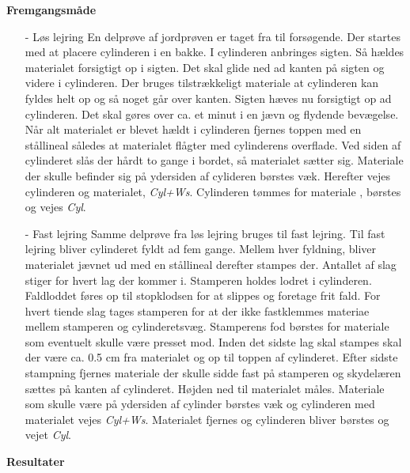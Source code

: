 \textbf{Fremgangsmåde}
\begin{itemize}
	\item[-] Løs lejring
En delprøve af jordprøven er taget fra til forsøgende. Der startes med at placere cylinderen i en bakke. I cylinderen anbringes sigten. Så hældes materialet forsigtigt  op i sigten. Det skal glide ned ad kanten på sigten og videre i cylinderen. Der bruges tilstrækkeligt materiale at cylinderen kan fyldes helt op og så noget går over kanten. Sigten hæves nu forsigtigt op ad cylinderen. Det skal gøres over ca. et minut  i en jævn og flydende bevægelse. Når alt materialet er blevet hældt i cylinderen fjernes toppen med en stållineal således at materialet flågter med cylinderens overflade. Ved siden af cylinderet slås der hårdt to gange i bordet, så materialet sætter sig. Materiale der skulle befinder sig på ydersiden af cylideren børstes væk. Herefter vejes cylinderen og materialet, \textit{Cyl+Ws}. Cylinderen tømmes for materiale , børstes og vejes \textit{Cyl}.
	\item[-] Fast lejring
Samme delprøve fra løs lejring bruges til fast lejring. Til fast lejring bliver cylinderet fyldt ad fem gange. Mellem hver fyldning, bliver materialet jævnet ud med en stållineal derefter stampes der. Antallet af slag stiger for hvert lag der kommer i. Stamperen holdes lodret i cylinderen. Faldloddet føres op til stopklodsen for at slippes og foretage frit fald. For hvert tiende slag tages stamperen for at der ikke fastklemmes materiae mellem stamperen og cylinderetsvæg. Stamperens fod børstes for materiale som eventuelt skulle være presset mod. Inden det sidste lag skal stampes skal der være ca. 0.5 cm fra materialet og op til toppen af cylinderet. Efter sidste stampning fjernes materiale der skulle sidde fast på stamperen og skydelæren sættes på kanten af cylinderet. Højden ned til materialet måles. Materiale som skulle være på ydersiden af cylinder børstes væk og cylinderen med materialet vejes \textit{Cyl+Ws}. Materialet fjernes og cylinderen bliver børstes og vejet \textit{Cyl}.
\end{itemize}

\textbf{Resultater}


